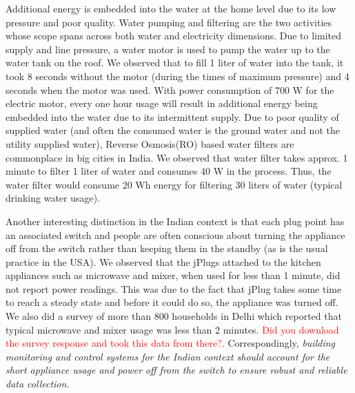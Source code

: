\documentclass[10pt]{sensys-proc}
\newcommand{\redcolor}[1]{\textcolor{red}{#1}}
\begin{document}
\noindent Additional energy is embedded into the water at the home level due to its low pressure and poor quality. Water pumping and filtering are the two activities whose scope spans across both water and electricity dimensions. Due to limited supply and line pressure, a water motor is used to pump the water up to the water tank on the roof. We observed that to fill 1 liter of water into the tank, it took 8 seconds without the motor (during the times of maximum pressure) and 4 seconds when the motor was used. With power consumption of 700 W for the electric motor, every one hour usage will result in additional energy being embedded into the water due to its intermittent supply. %
Due to poor quality of supplied water (and often the consumed water is the ground water and not the utility supplied water), Reverse Osmosis(RO) based water filters are commonplace in big cities in India. We observed that water filter takes approx. 1 minute to filter 1 liter of water and consumes 40 W in the process. Thus, the water filter would consume 20 Wh energy for filtering 30 liters of water (typical drinking water usage).

\noindent Another interesting distinction in the Indian context is that each plug point has an associated switch and people are often conscious about turning the appliance off from the switch rather than keeping them in the standby (as is the usual practice in the USA). We observed that the jPlugs attached to the kitchen appliances such as microwave and mixer, when used for less than 1 minute, did not report power readings. This was due to the fact that jPlug takes some time to reach a steady state and before it could do so, the appliance was turned off. We also did a survey of more than 800 households in Delhi which reported that typical microwave and mixer usage was less than 2 minutes. \redcolor{Did you download the survey response and took this data from there?}. Correspondingly, \emph{building monitoring and control systems for the Indian context should account for the short appliance usage and power off from the switch to ensure robust and reliable data collection.}
\end{document}
